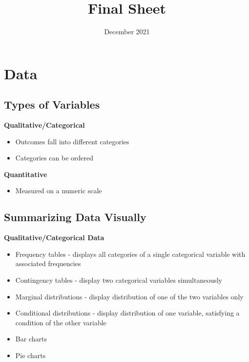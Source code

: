 \documentclass{article}
\title{Final Sheet}
\author{}
\date{December 2021}
\begin{document}
\maketitle

\section{Data}

\subsection{Types of Variables}

\textbf{Qualitative/Categorical}
\begin{itemize}
    \item Outcomes fall into different categories
    \item Categories can be ordered
\end{itemize}

\noindent
\textbf{Quantitative}
\begin{itemize}
    \item Measured on a numeric scale
\end{itemize}

\subsection{Summarizing Data Visually}

\textbf{Qualitative/Categorical Data}
\begin{itemize}
    \item Frequency tables - displays all categories of a single categorical variable with associated frequencies 
    \item Contingency tables - display two categorical variables simultaneously
    \item Marginal distributions - display distribution of one of the two variables only
    \item Conditional distributions - display distribution of one variable, satisfying a condition of the other variable
    \item Bar charts
    \item Pie charts
\end{itemize}
\end{document}
